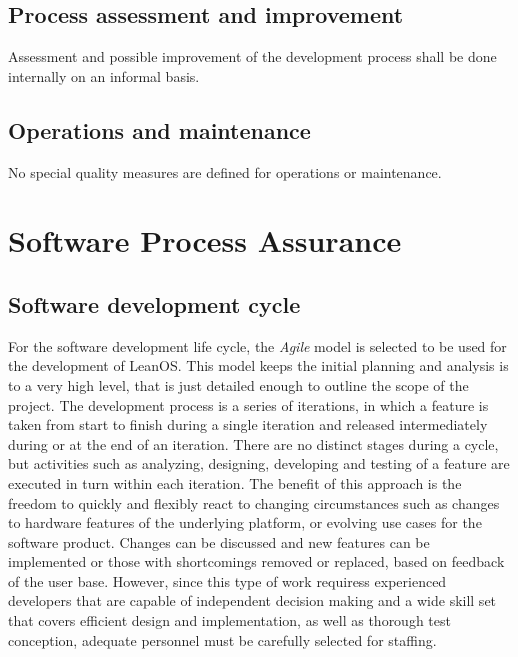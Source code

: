 \section{Process assessment and improvement}

Assessment and possible improvement of the development process shall be done 
internally on an informal basis.


\section{Operations and maintenance}

No special quality measures are defined for operations or maintenance.



\chapter{Software Process Assurance}


\section{Software development cycle}

For the software development life cycle, the \emph{Agile} model is selected to
be used for the development of LeanOS.
This model keeps the initial planning and analysis is to a very high level, that
is just detailed enough to outline the scope of the project. The development
process is a series of iterations, in which a feature is taken from start to
finish during a single iteration and released intermediately during or at the
end of an iteration. There are no distinct stages during a cycle, but activities
such as analyzing, designing, developing and testing of a feature are executed
in turn within each iteration.
The benefit of this approach is the freedom to quickly and flexibly react to
changing circumstances such as changes to hardware features of the underlying
platform, or evolving use cases for the software product. Changes can be
discussed and new features can be implemented or those with shortcomings removed
or replaced, based on feedback of the user base. However, since this type of
work requiress experienced developers that are capable of independent decision
making and a wide skill set that covers efficient design and implementation, as
well as thorough test conception, adequate personnel must be carefully selected
for staffing.



